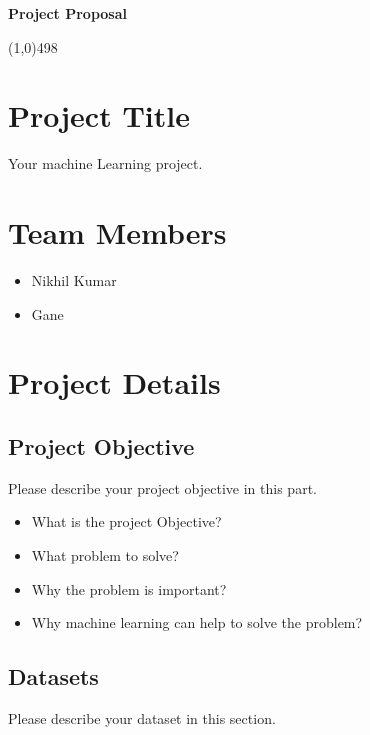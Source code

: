 \documentclass[11pt]{article}
\begin{document}
\begin{center}
{\Large \textbf{Project Proposal}}\\
\end{center}

\linethickness{1mm}\line(1,0){498}



\section{Project Title}

Your machine Learning project.

\section{Team Members}

\begin{itemize}
  \item Nikhil Kumar
  \item Gane
\end{itemize}

\section{Project Details}

\subsection{Project Objective}

Please describe your project objective in this part.

\begin{itemize}
  \item What is the project Objective?
  \item What problem to solve?
  \item Why the problem is important?
  \item Why machine learning can help to solve the problem?
\end{itemize}

\subsection{Datasets}

Please describe your dataset in this section.
\end{document}
